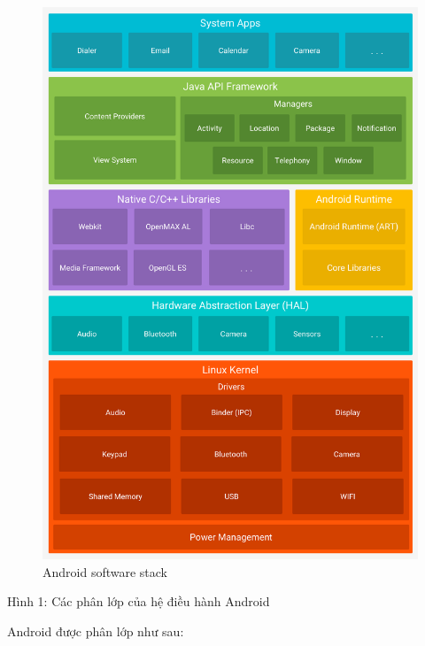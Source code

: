 \documentclass[
]{article}
\begin{document}
\begin{figure}
\centering
\includegraphics{../images/android-stack_2x.png}
\caption{Android software stack}
\end{figure}

Hình 1: Các phân lớp của hệ điều hành Android

Android được phân lớp như sau:
\end{document}
